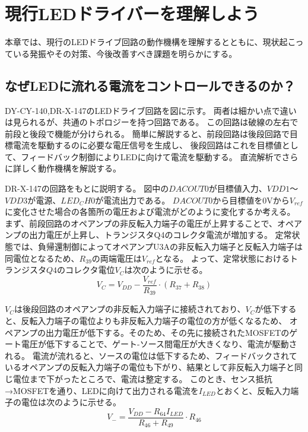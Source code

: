 \documentclass{ltjsarticle}
\begin{document}
\section{現行LEDドライバーを理解しよう}

本章では、現行のLEDドライブ回路の動作機構を理解するとともに、現状起こっている発振やその対策、今後改善すべき課題を明らかにする。
\subsection{なぜLEDに流れる電流をコントロールできるのか？}
DY-CY-140,DR-X-147のLEDドライブ回路を図に示す。
両者は細かい点で違いは見られるが、共通のトポロジーを持つ回路である。
この回路は破線の左右で前段と後段で機能が分けられる。
簡単に解説すると、前段回路は後段回路で目標電流を駆動するのに必要な電圧信号を生成し、
後段回路はこれを目標値として、フィードバック制御によりLEDに向けて電流を駆動する。
直流解析でさらに詳しく動作機構を解説する。

DR-X-147の回路をもとに説明する。
図中の$DAC  OUT0$が目標値入力、$VDD1$〜$VDD3$が電源、$LED_CH0$が電流出力である。
$DAC{OUT0}$から目標値を0Vから$V_{ref}$に変化させた場合の各箇所の電圧および電流がどのように変化するか考える。
まず、前段回路のオペアンプの非反転入力端子の電圧が上昇することで、オペアンプの出力電圧が上昇し、トランジスタQ4のコレクタ電流が増加する。
定常状態では、負帰還制御によってオペアンプU3Aの非反転入力端子と反転入力端子は同電位となるため、$R_{39}$の両端電圧は$V_{ref}$となる。
よって、定常状態におけるトランジスタ$Q4$のコレクタ電位$V_{C}$は次のように示せる。
\begin{equation}
    V_{C} = V_{DD} - \frac{V_{ref}}{R_{39}} \cdot (R_{37} + R_{38})
\end{equation}

$V_{C}$は後段回路のオペアンプの非反転入力端子に接続されており、$V_{C}$が低下すると、反転入力端子の電位よりも非反転入力端子の電位の方が低くなるため、
オペアンプの出力電圧が低下する。そのため、その先に接続されたMOSFETのゲート電圧が低下することで、ゲート-ソース間電圧が大きくなり、電流が駆動される。
電流が流れると、ソースの電位は低下するため、フィードバックされているオペアンプの反転入力端子の電位も下がり、結果として非反転入力端子と同じ電位まで下がったところで、電流は整定する。
このとき、センス抵抗→MOSFETを通り、LEDに向けて出力される電流を$I_{LED}$とおくと、反転入力端子の電位は次のように示せる。
\begin{equation}
    V_{-} = \frac{V_{DD} - R_{64}I_{LED}}{R_{46}+R_{49}} \cdot R_{46}
\end{equation}
\end{document}
